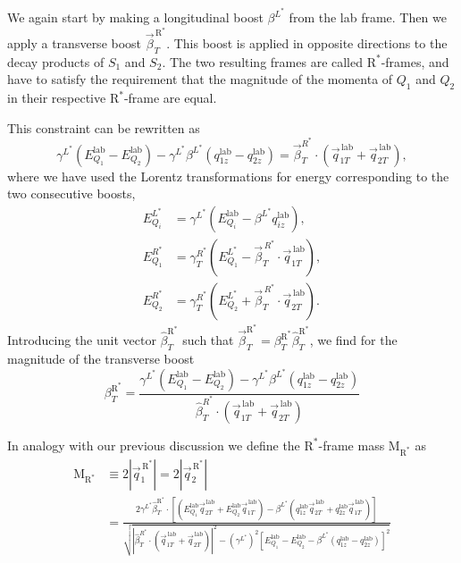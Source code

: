 
We again start by making a longitudinal boost $\beta^{L^*}$ from the lab frame. Then we apply a
transverse boost $\vec{\beta}_T^{\,\mathrm{R}^*}$. This boost is applied in opposite directions to
the
decay products of $S_1$ and $S_2$. The two resulting frames are called $\mathrm{R}^*$-frames, and
have to satisfy the requirement that the magnitude of the momenta of $Q_1$ and $Q_2$ in their
respective $\mathrm{R^*}$-frame are equal. 

This constraint can be rewritten as
\begin{equation}
  \gamma^{L^*} (E_{Q_1}^{\textrm{lab}} - E_{Q_2}^{\textrm{lab}}) - \gamma^{L^*} \beta^{L^*}
(q_{1z}^{\textrm{lab}} - q_{2z}^{\textrm{lab}}) = \vec{\beta}_T^{R^*} \cdot
(\vec{q}_{1T}^{\,\textrm{lab}} + \vec{q}_{2T}^{\,\textrm{lab}}), 
\end{equation}
where we have used the Lorentz transformations for energy corresponding to the two consecutive
boosts,
\begin{align}
  E_{Q_i}^{L^*} &= \gamma^{L^*} (E_{Q_i}^{\textrm{lab}} - \beta^{L^*} q_{iz}^{\textrm{lab}} ) , \\
  E_{Q_1}^{R^*} &= \gamma_T^{R^*} (E_{Q_1}^{L^*} - \vec{\beta}_T^{\,R^*} \cdot
\vec{q}_{1T}^{\,\textrm{lab}}) , \\
  E_{Q_2}^{R^*} &= \gamma_T^{R^*} (E_{Q_2}^{L^*} + \vec{\beta}_T^{\,R^*} \cdot
\vec{q}_{2T}^{\,\textrm{lab}}) .
\end{align}
Introducing the unit vector $\hat{\beta}_T^{\mathrm{R}^*}$ such that $\vec{\beta}_T^{\mathrm{R}^*} =
\beta_T^{\mathrm{R}^*} \hat{\beta}_T^{\mathrm{R}^*}$, we find for the magnitude of the transverse
boost
\begin{equation}
  \beta_T^{\mathrm{R}^*} = \frac{\gamma^{L^*} (E_{Q_1}^{\textrm{lab}} - E_{Q_2}^{\textrm{lab}}) -
\gamma^{L^*} \beta^{L^*} (q_{1z}^{\textrm{lab}} - q_{2z}^{\textrm{lab}})}{\hat{\beta}_T^{R^*} \cdot
(\vec{q}_{1T}^{\,\textrm{lab}} + \vec{q}_{2T}^{\,\textrm{lab}})}
\end{equation}

In analogy with our previous discussion we define the $\mathrm{R}^*$-frame mass $\mathrm{M_{R^*}}$
as
\begin{align}
  \mathrm{M_{R^*}} &\equiv 2 |\vec{q}_1^{\,\mathrm{R}^*}| = 2 |\vec{q}_2^{\,\mathrm{R}^*}| \\
                  &= \frac{2\gamma^{L^*} \hat{\beta}_T^{\mathrm{R}^*} \cdot \left[
(E_{Q_1}^{\textrm{lab}}\vec{q}_{2T}^{\,\textrm{lab}} +
E_{Q_2}^{\textrm{lab}}\vec{q}_{1T}^{\,\textrm{lab}}) - \beta^{L^*}
(q_{1z}^{\textrm{lab}}\vec{q}_{2T}^{\,\textrm{lab}} +
q_{2z}^{\textrm{lab}}\vec{q}_{1T}^{\,\textrm{lab}}) \right]}
                           {\sqrt{|\hat{\beta}_T^{R^*} \cdot (\vec{q}_{1T}^{\,\textrm{lab}} +
\vec{q}_{2T}^{\,\textrm{lab}})|^2 - (\gamma^{L^*})^2 \left[ E_{Q_1}^{\textrm{lab}} -
E_{Q_2}^{\textrm{lab}} - \beta^{L^*} (q_{1z}^{\textrm{lab}} - q_{2z}^{\textrm{lab}}) \right]^2}}
\end{align}

